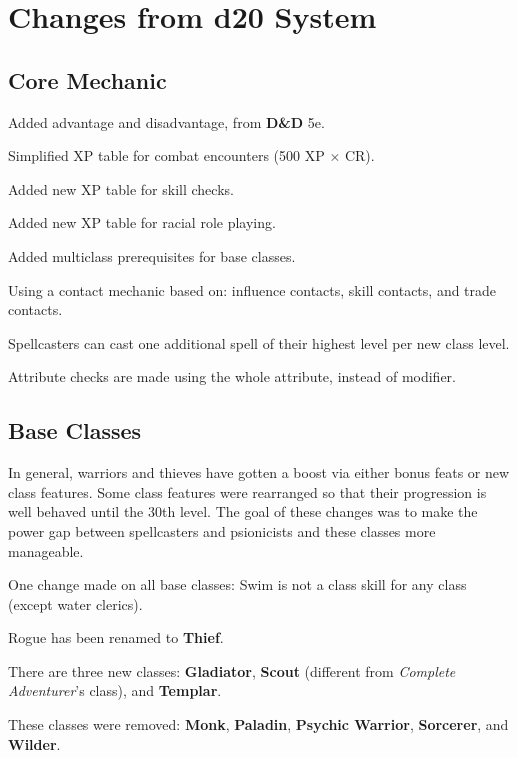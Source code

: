 \chapter{Changes from d20 System}
\label{apx:Changes from d20 System}

\section{Core Mechanic}
\begin{itemize*}
\item Added advantage and disadvantage, from \textbf{D\&D} 5e.
\item Simplified XP table for combat encounters (500 XP $\times$ CR).
\item Added new XP table for skill checks.
\item Added new XP table for racial role playing.
\item Added multiclass prerequisites for base classes.
\item Using a contact mechanic based on: influence contacts, skill contacts, and trade contacts.
\item Spellcasters can cast one additional spell of their highest level per new class level.
\item Attribute checks are made using the whole attribute, instead of modifier.
\end{itemize*}

\section{Base Classes}
In general, warriors and thieves have gotten a boost via either bonus feats or new class features. Some class features were rearranged so that their progression is well behaved until the 30th level. The goal of these changes was to make the power gap between spellcasters and psionicists and these classes more manageable.

One change made on all base classes: Swim is not a class skill for any class (except water clerics).

Rogue has been renamed to \textbf{Thief}.

There are three new classes: \textbf{Gladiator}, \textbf{Scout} (different from \emph{Complete Adventurer}'s class), and \textbf{Templar}.

These classes were removed: \textbf{Monk}, \textbf{Paladin}, \textbf{Psychic Warrior}, \textbf{Sorcerer}, and \textbf{Wilder}.

